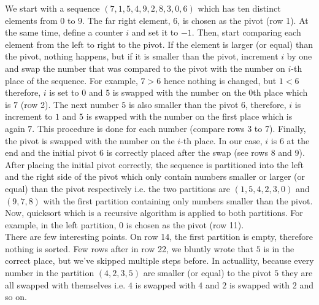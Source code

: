 We start with a sequence \((7, 1, 5, 4, 9, 2, 8, 3, 0, 6)\) which has ten distinct elements from \(0\) to \(9\). The far right element, \(6\), is chosen as the pivot (row 1). At the same time, define a counter \(i\) and set it to \(-1\). Then, start comparing each element from the left to right to the pivot. If the element is larger (or equal) than the pivot, nothing happens, but if it is smaller than the pivot, increment \(i\) by one and swap the number that was compared to the pivot with the number on \(i\)-th place of the sequence. For example, \(7 > 6\) hence nothing is changed, but \(1 < 6\) therefore, \(i\) is set to \(0\) and \(5\) is swapped with the number on the \(0\)th place which is \(7\) (row 2). The next number \(5\) is also smaller than the pivot \(6\), therefore, \(i\) is increment to \(1\) and \(5\) is swapped with the number on the first place which is again \(7\). This procedure is done for each number (compare rows 3 to 7). Finally, the pivot is swapped with the number on the \(i\)-th place. In our case, \(i\) is \(6\) at the end and the initial pivot \(6\) is correctly placed after the swap (see rows 8 and 9).
\\
After placing the initial pivot correctly, the sequence is partitioned into the left and the right side of the pivot which only contain numbers smaller or larger (or equal) than the pivot respectively i.e. the two partitions are \((1, 5, 4, 2, 3, 0)\) and \((9, 7, 8)\) with the first partition containing only numbers smaller than the pivot. Now, quicksort which is a recursive algorithm is applied to both partitions. For example, in the left partition, \(0\) is chosen as the pivot (row 11).
\\
There are few interesting points. On row 14, the first partition is empty, therefore nothing is sorted. Few rows after in row 22, we bluntly wrote that \(5\) is in the correct place, but we've skipped multiple steps before. In actuallity, because every number in the partition \((4, 2, 3, 5)\) are smaller (or equal) to the pivot \(5\) they are all swapped with themselves i.e. \(4\) is swapped with \(4\) and \(2\) is swapped with \(2\) and so on.
